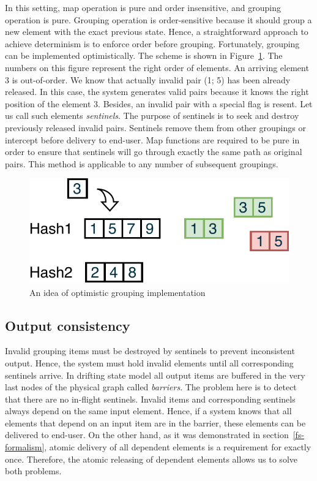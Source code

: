 In this setting, map operation is pure and order insensitive, and grouping operation is pure. Grouping operation is order-sensitive because it should group a new element with the exact previous state. Hence, a straightforward approach to achieve determinism is to enforce order before grouping. Fortunately, grouping can be implemented optimistically. The scheme is shown in Figure~\ref{optimistic-grouping}. The numbers on this figure represent the right order of elements. An arriving element 3 is out-of-order. We know that actually invalid pair (1; 5) has been already released. In this case, the system generates valid pairs because it knows the right position of the element 3. Besides, an invalid pair with a special flag is resent. Let us call such elements {\em sentinels}. The purpose of sentinels is to seek and destroy previously released invalid pairs. Sentinels remove them from other groupings or intercept before delivery to end-user. Map functions are required to be pure in order to ensure that sentinels will go through exactly the same path as original pairs. This method is applicable to any number of subsequent groupings.
 
\begin{figure}[htbp]
  \centering
  \includegraphics[width=.35\textwidth]{pics/grouping-invalidation}
  \caption{An idea of optimistic grouping implementation}
  \label {optimistic-grouping}
\end{figure} 

\subsection{Output consistency}

Invalid grouping items must be destroyed by sentinels to prevent inconsistent output. Hence, the system must hold invalid elements until all corresponding sentinels arrive. In drifting state model all output items are buffered in the very last nodes of the physical graph called {\em barriers}. The problem here is to detect that there are no in-flight sentinels. Invalid items and corresponding sentinels always depend on the same input element. Hence, if a system knows that all elements that depend on an input item are in the barrier, these elements can be delivered to end-user. On the other hand, as it was demonstrated in section~\ref{fs-formalism}, atomic delivery of all dependent elements is a requirement for exactly once. Therefore, the atomic releasing of dependent elements allows us to solve both problems. 

